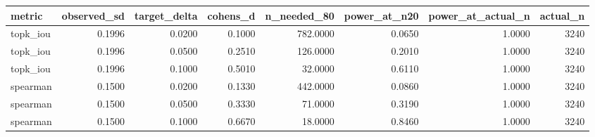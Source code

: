 \begin{tabular}{lrrrrrrr}
\toprule
metric & observed\_sd & target\_delta & cohens\_d & n\_needed\_80 & power\_at\_n20 & power\_at\_actual\_n & actual\_n \\
\midrule
topk\_iou & 0.1996 & 0.0200 & 0.1000 & 782.0000 & 0.0650 & 1.0000 & 3240 \\
topk\_iou & 0.1996 & 0.0500 & 0.2510 & 126.0000 & 0.2010 & 1.0000 & 3240 \\
topk\_iou & 0.1996 & 0.1000 & 0.5010 & 32.0000 & 0.6110 & 1.0000 & 3240 \\
spearman & 0.1500 & 0.0200 & 0.1330 & 442.0000 & 0.0860 & 1.0000 & 3240 \\
spearman & 0.1500 & 0.0500 & 0.3330 & 71.0000 & 0.3190 & 1.0000 & 3240 \\
spearman & 0.1500 & 0.1000 & 0.6670 & 18.0000 & 0.8460 & 1.0000 & 3240 \\
\bottomrule
\end{tabular}
